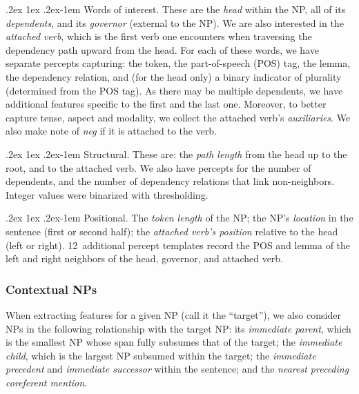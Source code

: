 \documentclass[11pt,letterpaper]{article}
\makeatletter
\renewcommand{\paragraph}{%
  \@startsection{paragraph}{4}%
  {\z@}{.2ex \@plus 1ex \@minus .2ex}{-1em}%
  {\normalfont\normalsize\bfseries}%
}
\makeatother
\begin{document}
\paragraph{Words of interest.} 
These are the \emph{head} within the NP, all of its \emph{dependents}, and its \emph{governor} (external to the NP). 
We are also interested in the \emph{attached verb}, which is the first verb one encounters when traversing the dependency path upward from the head. 
For each of these words, we have separate percepts capturing: the token, the part-of-speech (POS) tag, the lemma, 
the dependency relation,
and (for the head only) a binary indicator of plurality (determined from the POS tag).
As there may be multiple dependents, we have additional features specific to the first and the last one. 
Moreover, to better capture tense, aspect and modality, we collect the attached verb's \emph{auxiliaries}. 
We also make note of \emph{neg} if it is attached to the verb.
    
\paragraph{Structural.} 
These are: the \emph{path length} from the head up to the root, and to the attached verb. 
We also have percepts for the number of dependents, and the number of dependency relations that link non-neighbors.
Integer values were binarized with thresholding.

\paragraph{Positional.} 
The \emph{token length} of the NP; the NP's \emph{location} in the sentence (first or second half); 
the \emph{attached verb's position} relative to the head (left or right). 
12~additional percept templates record the POS and lemma of the left and right neighbors of the head, governor, and attached verb.

\subsubsection{Contextual NPs}

When extracting features for a given NP (call it the ``target''), 
we also consider NPs in the following relationship with the target NP:
its \emph{immediate parent}, which is the smallest NP whose span fully subsumes that of the target; 
the \emph{immediate child}, which is the largest NP subsumed within the target;
the \emph{immediate precedent} and \emph{immediate successor} within the sentence; 
and the \emph{nearest preceding coreferent mention}.
\end{document}
